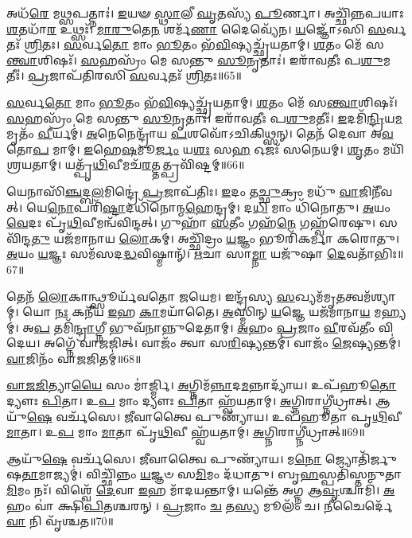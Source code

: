 𑌅𑌧᳴\-\ul{𑌰𑍇} 𑌮\-\ul{𑌥𑍍𑌸}\-𑌪𑌤𑍍𑌨𑌾𑌃॑।
\-\ul{𑌇}\-𑌯𑍟 \ul{𑌸𑍍𑌥𑌾}\-𑌲𑍀 \ul{𑌘𑍃}\-𑌤𑌸𑍍𑌯᳴ \ul{𑌪𑍂}\-𑌰𑍍𑌣𑌾।
𑌅𑌚𑍍𑌛𑌿᳴𑌨𑍍𑌨𑌪𑌯𑌾𑌃 \ul{𑌶}\-𑌤𑌧𑌾᳴\-\ul{𑌰} 𑌉𑌥𑍍𑌸𑌃᳴।
\-\ul{𑌮𑌾}\-\-\ul{𑌰𑍁}\-𑌤𑍇\-\ul{𑌨} 𑌶𑌰𑍍𑌮᳴\-\ul{𑌣𑌾} 𑌦𑍈𑌵𑍍𑌯𑍇᳴𑌨।
\-\ul{𑌯}\-𑌜𑍍𑌞𑍋᳴𑌽𑌸𑌿 \ul{𑌸}\-𑌰𑍍𑌵𑌤𑌃᳴ \ul{𑌶𑍍𑌰𑌿}\-𑌤𑌃।
\-\ul{𑌸}\-𑌰𑍍𑌵\-\ul{𑌤𑍋} 𑌮𑌾𑌂 \ul{𑌭𑍂}\-𑌤𑌂 𑌭᳴\-\ul{𑌵𑌿}\-𑌷𑍍𑌯𑌚𑍍𑌛𑍍𑌰᳴𑌯𑌤𑌾𑌮𑍍।
\-\ul{𑌶}\-𑌤𑌂 𑌮𑍇᳴ 𑌸\-\ul{𑌨𑍍𑌤𑍍𑌵𑌾}\-𑌶𑌿𑌷𑌃᳴।
\-\ul{𑌸}\-𑌹𑌸𑍍𑌰𑌂᳴ 𑌮𑍇 𑌸𑌨𑍍𑌤𑍁 \ul{𑌸𑍂}\-𑌨𑍃𑌤𑌾𑌃॑।
𑌇𑌰𑌾᳴𑌵𑌤𑍀𑌃 𑌪\-\ul{𑌶𑍁}\-𑌮𑌤𑍀𑌃॑।
\-\ul{𑌪𑍍𑌰}\-𑌜𑌾𑌪᳴𑌤𑌿𑌰𑌸𑌿 \ul{𑌸}\-𑌰𑍍𑌵𑌤𑌃᳴ \ul{𑌶𑍍𑌰𑌿}\-𑌤𑌃॥65॥

\-\ul{𑌸}\-𑌰𑍍𑌵\-\ul{𑌤𑍋} 𑌮𑌾𑌂 \ul{𑌭𑍂}\-𑌤𑌂 𑌭᳴\-\ul{𑌵𑌿}\-𑌷𑍍𑌯𑌚𑍍𑌛𑍍𑌰᳴𑌯𑌤𑌾𑌮𑍍।
\-\ul{𑌶}\-𑌤𑌂 𑌮𑍇᳴ 𑌸\-\ul{𑌨𑍍𑌤𑍍𑌵𑌾}\-𑌶𑌿𑌷𑌃᳴।
\-\ul{𑌸}\-𑌹𑌸𑍍𑌰𑌂᳴ 𑌮𑍇 𑌸𑌨𑍍𑌤𑍁 \ul{𑌸𑍂}\-𑌨𑍃𑌤𑌾𑌃॑।
𑌇𑌰𑌾᳴𑌵𑌤𑍀𑌃 𑌪\-\ul{𑌶𑍁}\-𑌮𑌤𑍀𑌃॑।
\-\ul{𑌇}\-𑌦𑌮𑌿᳴\-\ul{𑌨𑍍𑌦𑍍𑌰𑌿}\-𑌯\-\ul{𑌮}\-𑌮𑍃𑌤𑌂᳴ \ul{𑌵𑍀}\-𑌰𑍍𑌯𑌮𑍍॑।
\-\ul{𑌅}\-𑌨𑍇𑌨𑍇𑌨𑍍𑌦𑍍𑌰𑌾᳴𑌯 \ul{𑌪}\-𑌶𑌵𑍋᳴\-𑌽𑌚𑌿𑌕𑌿𑌥𑍍𑌸𑌨𑍍।
𑌤𑍇𑌨᳴ 𑌦𑍇𑌵𑌾 𑌅\-\ul{𑌵}\-𑌤𑍋\-\ul{𑌪} 𑌮𑌾𑌮𑍍।
\-\ul{𑌇}\-𑌹𑍇\-\ul{𑌷}\-𑌮𑍂\-\ul{𑌰𑍍𑌜𑌂} 𑌯\-\ul{𑌶𑌃} 𑌸\-\ul{𑌹} 𑌓𑌜𑌃᳴ 𑌸𑌨𑍇𑌯𑌮𑍍।
\-\ul{𑌶𑍃}\-𑌤𑌂 𑌮𑌯𑌿᳴ 𑌶𑍍𑌰𑌯𑌤𑌾𑌮𑍍।
𑌯𑌤𑍍𑌪𑍃᳴\-\ul{𑌥𑌿}\-𑌵𑍀𑌮𑌚᳴\-\ul{𑌰}\-𑌤𑍍𑌤𑌤𑍍𑌪𑍍𑌰𑌵𑌿᳴𑌷𑍍𑌟𑌮𑍍॥66॥

𑌯𑍇𑌨𑌾𑌸𑌿᳴\-\ul{𑌞𑍍𑌚}\-𑌦𑍍𑌬\-\ul{𑌲}\-𑌮𑌿𑌨𑍍𑌦𑍍𑌰𑍇॑ \ul{𑌪𑍍𑌰}\-𑌜𑌾\-𑌪᳴𑌤𑌿𑌃।
\-\ul{𑌇}\-𑌦𑌂 𑌤\-\ul{𑌚𑍍𑌛𑍁}\-𑌕𑍍𑌰𑌂 𑌮𑌧𑍁᳴ \ul{𑌵𑌾}\-𑌜𑌿𑌨𑍀᳴𑌵𑌤𑍍।
𑌯𑍇\-\ul{𑌨𑍋}\-𑌪𑌰𑌿᳴\-\ul{𑌷𑍍𑌟𑌾}\-𑌦𑌧𑌿᳴𑌨𑍋𑌨𑍍𑌮\-\ul{𑌹𑍇}\-𑌨𑍍𑌦𑍍𑌰𑌮𑍍।
𑌦\-\ul{𑌧𑌿} 𑌮𑌾𑌂 𑌧𑌿᳴𑌨𑍋𑌤𑍁।
\-\ul{𑌅}\-𑌯𑌂 \ul{𑌵𑍇}\-𑌦𑌃 𑌪𑍃᳴\-\ul{𑌥𑌿}\-𑌵𑍀𑌮𑌨𑍍𑌵᳴𑌵𑌿𑌨𑍍𑌦𑌤𑍍।
𑌗𑍁𑌹𑌾᳴ \ul{𑌸}\-𑌤𑍀𑌂 𑌗𑌹᳴\-\ul{𑌨𑍇} 𑌗𑌹𑍍𑌵᳴𑌰𑍇𑌷𑍁।
𑌸 𑌵𑌿᳴𑌨𑍍𑌦\-\ul{𑌤𑍁} 𑌯𑌜᳴𑌮𑌾𑌨𑌾𑌯 \ul{𑌲𑍋}\-𑌕𑌮𑍍।
𑌅𑌚𑍍𑌛𑌿᳴𑌦𑍍𑌰𑌂 \ul{𑌯}\-𑌜𑍍𑌞𑌂 𑌭𑍂𑌰𑌿᳴𑌕𑌰𑍍𑌮𑌾 𑌕𑌰𑍋𑌤𑍁।
\-\ul{𑌅}\-𑌯𑌂 \ul{𑌯}\-𑌜𑍍𑌞𑌃 𑌸𑌮᳴𑌸𑌦\-\ul{𑌦𑍍𑌧}\-𑌵𑌿𑌷𑍍𑌮𑌾𑌨𑍍᳴।
\-\ul{𑌋}\-𑌚𑌾 𑌸𑌾\-\ul{𑌮𑍍𑌨𑌾} 𑌯𑌜𑍁᳴𑌷𑌾 \ul{𑌦𑍇}\-𑌵𑌤𑌾᳴𑌭𑌿𑌃॥67॥

𑌤𑍇𑌨᳴ \ul{𑌲𑍋}\-𑌕𑌾𑌨𑍍𑌥𑍍𑌸𑍂𑌰𑍍𑌯᳴𑌵𑌤𑍋 𑌜𑌯𑍇𑌮।
𑌇𑌨𑍍𑌦𑍍𑌰᳴𑌸𑍍𑌯 \ul{𑌸}\-𑌖𑍍𑌯𑌮᳴𑌮𑍃\-\ul{𑌤}\-𑌤𑍍𑌵𑌮᳴\-𑌶𑍍𑌯𑌾𑌮𑍍।
𑌯𑍋 \ul{𑌨𑌃} 𑌕𑌨𑍀᳴𑌯 \ul{𑌇}\-𑌹 \ul{𑌕𑌾}\-𑌮𑌯𑌾᳴𑌤𑍈।
\-\ul{𑌅}\-𑌸𑍍𑌮𑌿𑌨𑍍 \ul{𑌯}\-𑌜𑍍𑌞𑍇 𑌯𑌜᳴𑌮𑌾𑌨𑌾\-\ul{𑌯} 𑌮𑌹𑍍𑌯𑌮𑍍॑।
𑌅\-\ul{𑌪} 𑌤𑌮𑌿᳴\-\ul{𑌨𑍍𑌦𑍍𑌰𑌾}\-𑌗𑍍𑌨𑍀 𑌭𑍁𑌵᳴𑌨𑌾𑌨𑍍𑌨𑍁𑌦𑍇𑌤𑌾𑌮𑍍।
\-\ul{𑌅}\-𑌹𑌂 \ul{𑌪𑍍𑌰}\-𑌜𑌾𑌂 \ul{𑌵𑍀}\-𑌰𑌵᳴𑌤𑍀𑌂 𑌵𑌿𑌦𑍇𑌯।
𑌅𑌗𑍍𑌨𑍇᳴ 𑌵𑌾𑌜𑌜𑌿𑌤𑍍।
𑌵𑌾𑌜𑌂᳴ 𑌤𑍍𑌵𑌾 𑌸\-\ul{𑌰𑌿}\-𑌷𑍍𑌯𑌨𑍍𑌤𑌮𑍍॑।
𑌵𑌾𑌜𑌂᳴ \ul{𑌜𑍇}\-𑌷𑍍𑌯𑌨𑍍𑌤𑌮𑍍॑।
\-\ul{𑌵𑌾}\-𑌜𑌿𑌨𑌂᳴ 𑌵𑌾\-\ul{𑌜}\-𑌜𑌿𑌤𑌮𑍍॑॥68॥

\-\ul{𑌵𑌾}\-\-\ul{𑌜}\-\-\ul{𑌜𑌿}\-𑌤𑍍𑌯𑌾\-\ul{𑌯𑍈} 𑌸𑌂 𑌮𑌾॑𑌰𑍍𑌜𑍍𑌮𑌿।
\-\ul{𑌅}\-𑌗𑍍𑌨𑌿𑌮᳴\-\ul{𑌨𑍍𑌨𑌾}\-𑌦\-\ul{𑌮}\-𑌨𑍍𑌨𑌾𑌦𑍍𑌯𑌾᳴𑌯।
𑌉𑌪᳴𑌹𑍂\-\ul{𑌤𑍋} 𑌦𑍍𑌯𑍗𑌃 \ul{𑌪𑌿}\-𑌤𑌾।
𑌉\-\ul{𑌪} 𑌮𑌾𑌂 𑌦𑍍𑌯𑍗𑌃 \ul{𑌪𑌿}\-𑌤𑌾 𑌹𑍍𑌵᳴𑌯𑌤𑌾𑌮𑍍।
\-\ul{𑌅}\-𑌗𑍍𑌨𑌿𑌰𑌾𑌗𑍍𑌨𑍀॑𑌧𑍍𑌰𑌾𑌤𑍍।
𑌆𑌯𑍁᳴\-\ul{𑌷𑍇} 𑌵𑌰𑍍𑌚᳴𑌸𑍇।
\-\ul{𑌜𑍀}\-𑌵𑌾𑌤𑍍𑌵𑍈 𑌪𑍁𑌣𑍍𑌯𑌾᳴𑌯।
𑌉𑌪᳴𑌹𑍂𑌤𑌾 𑌪𑍃\-\ul{𑌥𑌿}\-𑌵𑍀 \ul{𑌮𑌾}\-𑌤𑌾।
𑌉\-\ul{𑌪} 𑌮𑌾𑌂 \ul{𑌮𑌾}\-𑌤𑌾 𑌪𑍃᳴\-\ul{𑌥𑌿}\-𑌵𑍀 𑌹𑍍𑌵᳴𑌯𑌤𑌾𑌮𑍍।
\-\ul{𑌅}\-𑌗𑍍𑌨𑌿𑌰𑌾𑌗𑍍𑌨𑍀॑𑌧𑍍𑌰𑌾𑌤𑍍॥69॥

𑌆𑌯𑍁᳴\-\ul{𑌷𑍇} 𑌵𑌰𑍍𑌚᳴𑌸𑍇।
\-\ul{𑌜𑍀}\-𑌵𑌾𑌤𑍍𑌵𑍈 𑌪𑍁𑌣𑍍𑌯𑌾᳴𑌯।
𑌮\-\ul{𑌨𑍋} 𑌜𑍍𑌯𑍋𑌤𑌿᳴𑌰𑍍𑌜𑍁𑌷\-\ul{𑌤𑌾}\-𑌮𑌾\-𑌜𑍍𑌯𑌮𑍍॑।
𑌵𑌿𑌚𑍍𑌛𑌿᳴𑌨𑍍𑌨𑌂 \ul{𑌯}\-𑌜𑍍𑌞𑍞 𑌸\-\ul{𑌮𑌿}\-𑌮𑌂 𑌦᳴𑌧𑌾𑌤𑍁।
𑌬𑍃\-\ul{𑌹}\-𑌸𑍍𑌪𑌤𑌿᳴𑌸𑍍𑌤𑌨𑍁𑌤𑌾\-\ul{𑌮𑌿}\-𑌮𑌂 𑌨𑌃᳴।
𑌵𑌿𑌶𑍍𑌵𑍇᳴ \ul{𑌦𑍇}\-𑌵𑌾 \ul{𑌇}\-𑌹 𑌮𑌾᳴𑌦𑌯𑌨𑍍𑌤𑌾𑌮𑍍।
𑌯𑌨𑍍𑌤𑍇᳴ 𑌅𑌗𑍍𑌨 𑌆\-\ul{𑌵𑍃}\-𑌶𑍍𑌚𑌾𑌮𑌿᳴।
\-\ul{𑌅}\-𑌹𑌂 𑌵𑌾॑ 𑌕𑍍𑌷𑌿\-\ul{𑌪𑌿}\-𑌤𑌶𑍍𑌚𑌰𑌨𑍍।
\-\ul{𑌪𑍍𑌰}\-𑌜𑌾𑌂 \ul{𑌚} 𑌤\-\ul{𑌸𑍍𑌯} 𑌮𑍂𑌲𑌂᳴ 𑌚।
\-\ul{𑌨𑍀}\-𑌚𑍈𑌰𑍍𑌦𑍇᳴\-\ul{𑌵𑌾} 𑌨𑌿 𑌵𑍃᳴𑌶𑍍𑌚𑌤॥70॥

